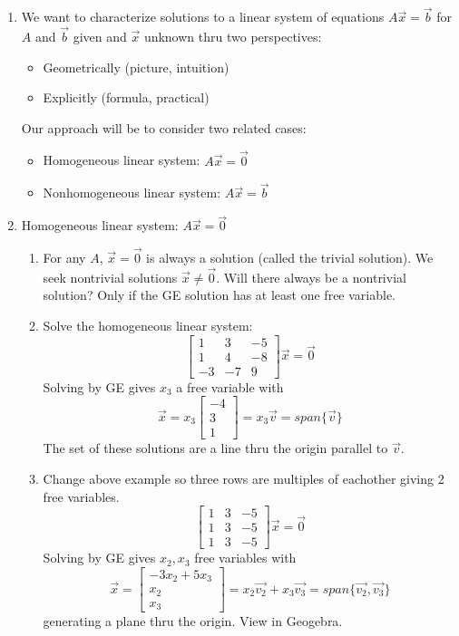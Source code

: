\documentclass{article}
\begin{document}
\begin{enumerate}

\item We want to characterize solutions to a linear system of equations $A\vec{x} = \vec{b}$ for $A$ and $\vec{b}$ given and $\vec{x}$ unknown thru two perspectives:
\begin{itemize}
\item Geometrically (picture, intuition)
\item Explicitly (formula, practical)
\end{itemize}
Our approach will be to consider two related cases:
\begin{itemize}
\item Homogeneous linear system: $A\vec{x} = \vec{0}$
\item Nonhomogeneous linear system: $A\vec{x} = \vec{b}$
\end{itemize}

\item Homogeneous linear system: $A\vec{x} = \vec{0}$
\begin{enumerate}

\item For any $A$, $\vec{x} = \vec{0}$ is always a solution (called the trivial solution). We seek nontrivial solutions $\vec{x} \neq \vec{0}$. Will there always be a nontrivial solution? Only if the GE solution has at least one free variable.

\item Solve the homogeneous linear system:
\[
\left[
\begin{array}{ccc}
1 & 3 & -5 \\
1 & 4 & -8 \\
-3 & -7 & 9 
\end{array}
\right]
\vec{x} = 
\vec{0}
\]
Solving by GE gives $x_3$ a free variable with
\[
\vec{x} = 
x_3\left[
\begin{array}{ccc}
-4 \\
3 \\
1 
\end{array}
\right]
= x_3 \vec{v} = span \{ \vec{v} \}
\]
The set of these solutions are a line thru the origin parallel to $\vec{v}$. 


\item Change above example so three rows are multiples of eachother giving 2 free variables. 
\[
\left[
\begin{array}{ccc}
1 & 3 & -5 \\
1 & 3 & -5 \\
1 & 3 & -5 
\end{array}
\right]
\vec{x} = 
\vec{0}
\]
Solving by GE gives $x_2, x_3$ free variables with
\[
\vec{x} = 
\left[
\begin{array}{ccc}
-3x_2+5x_3 \\
x_2 \\
x_3 
\end{array}
\right]
= x_2 \vec{v_2} +  x_3 \vec{v_3} = span \{ \vec{v_2}, \vec{v_3} \}
\]
generating a plane thru the origin. View in Geogebra.


\end{enumerate}
\end{enumerate}
\end{document}
